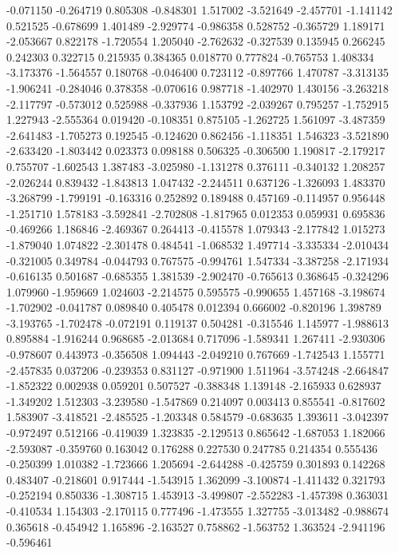-0.071150
-0.264719
0.805308
-0.848301
1.517002
-3.521649
-2.457701
-1.141142
0.521525
-0.678699
1.401489
-2.929774
-0.986358
0.528752
-0.365729
1.189171
-2.053667
0.822178
-1.720554
1.205040
-2.762632
-0.327539
0.135945
0.266245
0.242303
0.322715
0.215935
0.384365
0.018770
0.777824
-0.765753
1.408334
-3.173376
-1.564557
0.180768
-0.046400
0.723112
-0.897766
1.470787
-3.313135
-1.906241
-0.284046
0.378358
-0.070616
0.987718
-1.402970
1.430156
-3.263218
-2.117797
-0.573012
0.525988
-0.337936
1.153792
-2.039267
0.795257
-1.752915
1.227943
-2.555364
0.019420
-0.108351
0.875105
-1.262725
1.561097
-3.487359
-2.641483
-1.705273
0.192545
-0.124620
0.862456
-1.118351
1.546323
-3.521890
-2.633420
-1.803442
0.023373
0.098188
0.506325
-0.306500
1.190817
-2.179217
0.755707
-1.602543
1.387483
-3.025980
-1.131278
0.376111
-0.340132
1.208257
-2.026244
0.839432
-1.843813
1.047432
-2.244511
0.637126
-1.326093
1.483370
-3.268799
-1.799191
-0.163316
0.252892
0.189488
0.457169
-0.114957
0.956448
-1.251710
1.578183
-3.592841
-2.702808
-1.817965
0.012353
0.059931
0.695836
-0.469266
1.186846
-2.469367
0.264413
-0.415578
1.079343
-2.177842
1.015273
-1.879040
1.074822
-2.301478
0.484541
-1.068532
1.497714
-3.335334
-2.010434
-0.321005
0.349784
-0.044793
0.767575
-0.994761
1.547334
-3.387258
-2.171934
-0.616135
0.501687
-0.685355
1.381539
-2.902470
-0.765613
0.368645
-0.324296
1.079960
-1.959669
1.024603
-2.214575
0.595575
-0.990655
1.457168
-3.198674
-1.702902
-0.041787
0.089840
0.405478
0.012394
0.666002
-0.820196
1.398789
-3.193765
-1.702478
-0.072191
0.119137
0.504281
-0.315546
1.145977
-1.988613
0.895884
-1.916244
0.968685
-2.013684
0.717096
-1.589341
1.267411
-2.930306
-0.978607
0.443973
-0.356508
1.094443
-2.049210
0.767669
-1.742543
1.155771
-2.457835
0.037206
-0.239353
0.831127
-0.971900
1.511964
-3.574248
-2.664847
-1.852322
0.002938
0.059201
0.507527
-0.388348
1.139148
-2.165933
0.628937
-1.349202
1.512303
-3.239580
-1.547869
0.214097
0.003413
0.855541
-0.817602
1.583907
-3.418521
-2.485525
-1.203348
0.584579
-0.683635
1.393611
-3.042397
-0.972497
0.512166
-0.419039
1.323835
-2.129513
0.865642
-1.687053
1.182066
-2.593087
-0.359760
0.163042
0.176288
0.227530
0.247785
0.214354
0.555436
-0.250399
1.010382
-1.723666
1.205694
-2.644288
-0.425759
0.301893
0.142268
0.483407
-0.218601
0.917444
-1.543915
1.362099
-3.100874
-1.411432
0.321793
-0.252194
0.850336
-1.308715
1.453913
-3.499807
-2.552283
-1.457398
0.363031
-0.410534
1.154303
-2.170115
0.777496
-1.473555
1.327755
-3.013482
-0.988674
0.365618
-0.454942
1.165896
-2.163527
0.758862
-1.563752
1.363524
-2.941196
-0.596461
